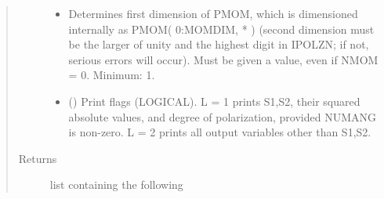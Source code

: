 \documentclass[letterpaper,10pt,english]{sphinxmanual}
\begin{document}
\begin{fulllineitems}
\begin{quote}
\begin{description}
\begin{itemize}
\item {} 
 \textendash{} Determines first dimension of PMOM, which is dimensioned
internally as PMOM( 0:MOMDIM, * ) (second dimension must
be the larger of unity and the highest digit in
IPOLZN; if not, serious errors will occur).
Must be given a value, even if  NMOM = 0.  Minimum: 1.

\item {} 
 () \textendash{} Print flags (LOGICAL).  L = 1  prints  S1,S2, their
squared absolute values, and degree of polarization,
provided NUMANG is non-zero.   L = 2  prints all
output variables other than  S1,S2.

\end{itemize}

\item[{Returns}] \leavevmode
list containing the following

\end{description}\end{quote}


\end{fulllineitems}
\end{document}
